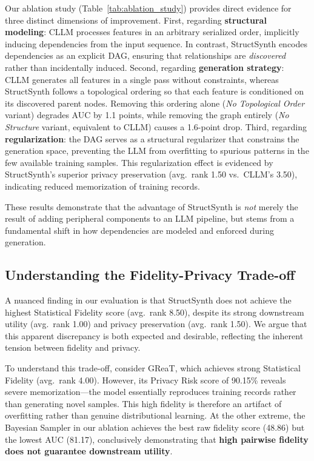 Our ablation study (Table~\ref{tab:ablation_study}) provides direct evidence for three distinct dimensions of improvement. First, regarding \textbf{structural modeling}: CLLM processes features in an arbitrary serialized order, implicitly inducing dependencies from the input sequence. In contrast, StructSynth encodes dependencies as an explicit DAG, ensuring that relationships are \emph{discovered} rather than incidentally induced. Second, regarding \textbf{generation strategy}: CLLM generates all features in a single pass without constraints, whereas StructSynth follows a topological ordering so that each feature is conditioned on its discovered parent nodes. Removing this ordering alone (\textit{No Topological Order} variant) degrades AUC by 1.1 points, while removing the graph entirely (\textit{No Structure} variant, equivalent to CLLM) causes a 1.6-point drop. Third, regarding \textbf{regularization}: the DAG serves as a structural regularizer that constrains the generation space, preventing the LLM from overfitting to spurious patterns in the few available training samples. This regularization effect is evidenced by StructSynth's superior privacy preservation (avg.\ rank 1.50 vs.\ CLLM's 3.50), indicating reduced memorization of training records.

These results demonstrate that the advantage of StructSynth is \emph{not} merely the result of adding peripheral components to an LLM pipeline, but stems from a fundamental shift in how dependencies are modeled and enforced during generation.

\subsection{Understanding the Fidelity-Privacy Trade-off}
\label{sec:fidelity_discussion}
A nuanced finding in our evaluation is that StructSynth does not achieve the highest Statistical Fidelity score (avg.\ rank 8.50), despite its strong downstream utility (avg.\ rank 1.00) and privacy preservation (avg.\ rank 1.50). We argue that this apparent discrepancy is both expected and desirable, reflecting the inherent tension between fidelity and privacy.

To understand this trade-off, consider GReaT, which achieves strong Statistical Fidelity (avg.\ rank 4.00). However, its Privacy Risk score of 90.15\% reveals severe memorization---the model essentially reproduces training records rather than generating novel samples. This high fidelity is therefore an artifact of overfitting rather than genuine distributional learning. At the other extreme, the Bayesian Sampler in our ablation achieves the best raw fidelity score (48.86) but the lowest AUC (81.17), conclusively demonstrating that \textbf{high pairwise fidelity does not guarantee downstream utility}.

